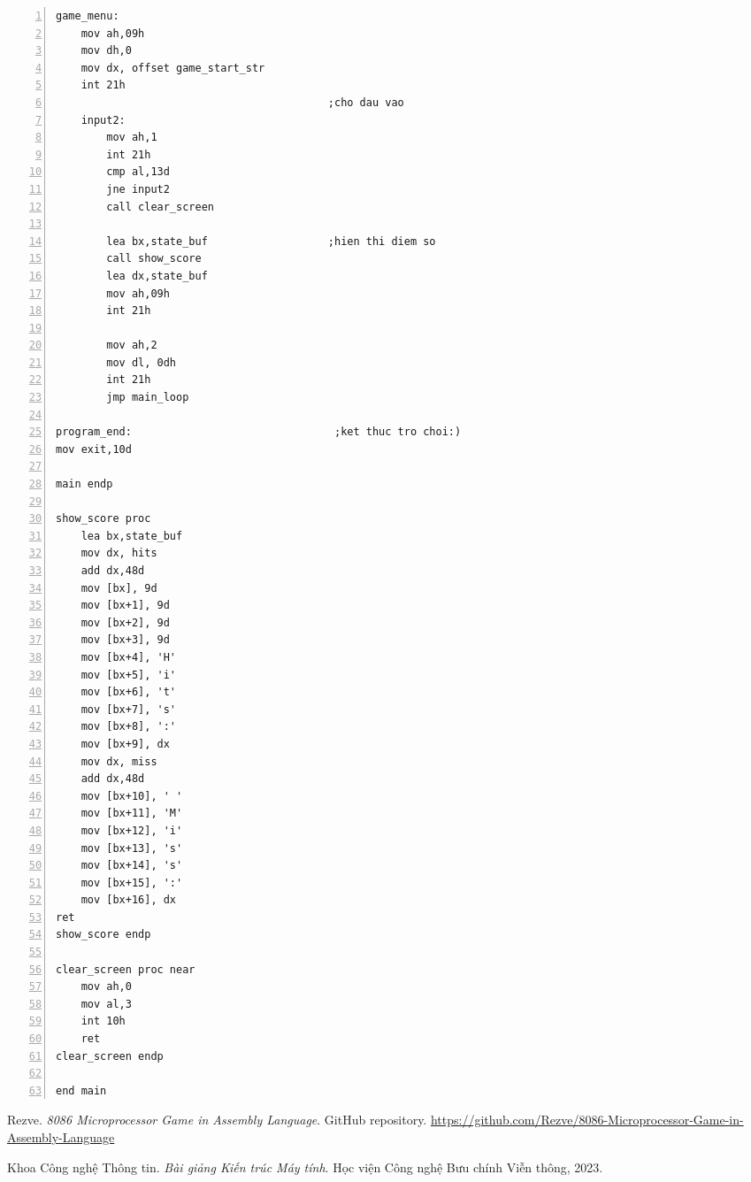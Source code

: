 \documentclass[12pt,a4paper,openany,oneside]{report}
\begin{document}
\begin{lstlisting}[caption={Mã nguồn Game}, basicstyle=\ttfamily\footnotesize, numbers=left, numberstyle=\tiny, stepnumber=1, numbersep=5pt, breaklines=true, language={[x86masm]Assembler}]
game_menu:
    mov ah,09h
    mov dh,0
    mov dx, offset game_start_str
    int 21h
                                           ;cho dau vao
    input2:
        mov ah,1
        int 21h
        cmp al,13d
        jne input2
        call clear_screen
        
        lea bx,state_buf                   ;hien thi diem so
        call show_score 
        lea dx,state_buf
        mov ah,09h
        int 21h
    
        mov ah,2
        mov dl, 0dh
        int 21h
        jmp main_loop

program_end:                                ;ket thuc tro choi:)
mov exit,10d

main endp

show_score proc
    lea bx,state_buf
    mov dx, hits
    add dx,48d 
    mov [bx], 9d
    mov [bx+1], 9d
    mov [bx+2], 9d
    mov [bx+3], 9d
    mov [bx+4], 'H'
    mov [bx+5], 'i'                                      
    mov [bx+6], 't'
    mov [bx+7], 's'
    mov [bx+8], ':'
    mov [bx+9], dx
    mov dx, miss
    add dx,48d
    mov [bx+10], ' '
    mov [bx+11], 'M'
    mov [bx+12], 'i'
    mov [bx+13], 's'
    mov [bx+14], 's'
    mov [bx+15], ':'
    mov [bx+16], dx
ret    
show_score endp 

clear_screen proc near
    mov ah,0
    mov al,3
    int 10h        
    ret
clear_screen endp

end main
\end{lstlisting}



\begin{thebibliography}{99}

Rezve. \emph{8086 Microprocessor Game in Assembly Language}. GitHub repository. 
\href{https://github.com/Rezve/8086-Microprocessor-Game-in-Assembly-Language}{https://github.com/Rezve/8086-Microprocessor-Game-in-Assembly-Language}

Khoa Công nghệ Thông tin. \emph{Bài giảng Kiến trúc Máy tính}. Học viện Công nghệ Bưu chính Viễn thông, 2023.


\end{thebibliography}
\end{document}
